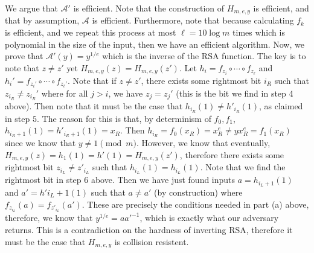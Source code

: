 \documentclass{article}
\begin{document}
\begin{enumerate}
\begin{enumerate}[,label=\alph*.]
We argue that $\mathcal{A'}$ is efficient. Note that the construction of $H_{m,e,y}$ is efficient,
and that by assumption, $\mathcal{A}$ is efficient. Furthermore, note that because calculating
$f_k$ is efficient, and we repeat this process at most $\ell = 10 \log m$ times which is polynomial
in the size of the input, then we have an efficient algorithm.
Now, we prove that $\mathcal{A'}(y) = y^{1/e}$ which is the inverse of the RSA function. The key is
to note that $z \neq z'$ yet $H_{m,e,y}(z) = H_{m,e,y}(z')$. Let $h_i = f_{z_{i}} \circ \cdots \circ f_{z_{\ell}}$
and $h_i' = f_{z_{i}'} \circ \cdots \circ f_{z_{\ell}'}$. Note that if $z \neq z'$, there exists
some rightmost bit $i_R$ such that $z_{i_R} \neq z_{i_R}'$ where for all $j > i$, we have $z_j = z_j'$ 
(this is the bit we find in step 4 above). 
Then note that it must be the 
case that $h_{i_R}(1) \neq h'_{i_R}(1)$, as claimed in step $5$. The reason for this is that, by determinism
of $f_0,f_1$, $h_{i_R+1}(1) = h'_{i_R+1}(1) = x_R$. Then $h_{i_R} = f_{0}(x_R) = x_R^e \neq yx_R^e = f_1(x_R)$
since we know that $y \neq 1 \pmod m$. However, we know that eventually, $H_{m,e,y}(z) = h_1(1) = h'(1) = H_{m,e,y}(z')$,
therefore there exists some rightmost bit $z_{i_L} \neq z'_{i_L}$ such that $h_{i_L}(1) = h_{i_L}(1)$. Note that we
find the rightmost bit in step 6 above. Then we have just found inputs $a = h_{i_L + 1}(1)$ and $a' = h'{i_L + 1}(1)$
such that $a \neq a'$ (by construction) where $f_{z_{i_L}}(a) = f_{z'_{i_L}}(a')$. These are precisely
the conditions needed in part (a) above, therefore, we know that $y^{1/e} = aa'^{-1}$,
which is exactly what our adversary returns. This is a contradiction on the hardness
of inverting RSA, therefore it must be the case that $H_{m,e,y}$ is collision resistent.%
\end{enumerate}%


\end{enumerate}
\end{document}
